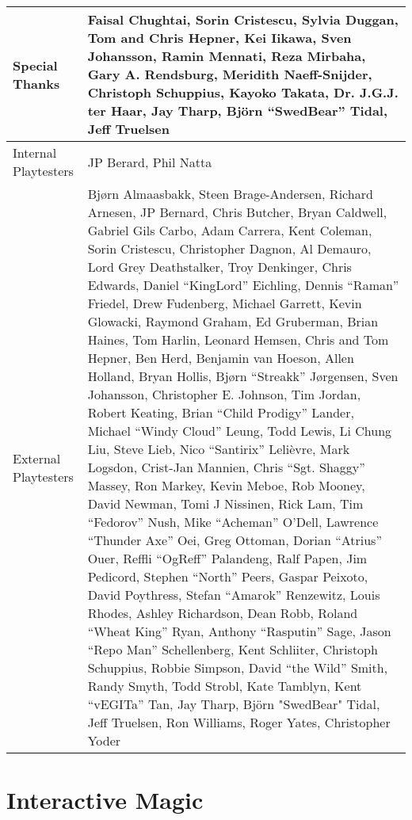 \begin{tabular}{ | p{4cm} | p{9cm} |}
	\hline
Special Thanks	& Faisal Chughtai, Sorin Cristescu, Sylvia Duggan, Tom and Chris Hepner, Kei Iikawa, Sven Johansson, Ramin Mennati, Reza Mirbaha, Gary A. Rendsburg, Meridith Naeff-Snijder, Christoph Schuppius, Kayoko Takata, Dr. J.G.J. ter Haar, Jay Tharp, Björn “SwedBear” Tidal, Jeff Truelsen \\ \hline
Internal Playtesters	& JP Berard, Phil Natta \\ \hline
External Playtesters	& Bjørn Almaasbakk, Steen Brage-Andersen, Richard Arnesen, JP Bernard, Chris Butcher, Bryan Caldwell, Gabriel Gils Carbo, Adam Carrera, Kent Coleman, Sorin Cristescu, Christopher Dagnon, Al Demauro, Lord Grey Deathstalker, Troy Denkinger, Chris Edwards, Daniel “KingLord” Eichling, Dennis “Raman” Friedel, Drew Fudenberg, Michael Garrett, Kevin Glowacki, Raymond Graham, Ed Gruberman, Brian Haines, Tom Harlin, Leonard Hemsen, Chris and Tom Hepner, Ben Herd, Benjamin van Hoeson, Allen Holland, Bryan Hollis, Bjørn “Streakk” Jørgensen, Sven Johansson, Christopher E. Johnson, Tim Jordan, Robert Keating, Brian “Child Prodigy” Lander, Michael “Windy Cloud” Leung, Todd Lewis, Li Chung Liu, Steve Lieb, Nico “Santirix” Lelièvre, Mark Logsdon, Crist-Jan Mannien, Chris “Sgt. Shaggy” Massey, Ron Markey, Kevin Meboe, Rob Mooney, David Newman, Tomi J Nissinen, Rick Lam, Tim “Fedorov” Nush, Mike “Acheman” O'Dell, Lawrence “Thunder Axe” Oei, Greg Ottoman, Dorian “Atrius” Ouer, Reffli “OgReff” Palandeng, Ralf Papen, Jim Pedicord, Stephen “North” Peers, Gaspar Peixoto, David Poythress, Stefan “Amarok” Renzewitz, Louis Rhodes, Ashley Richardson, Dean Robb, Roland “Wheat King” Ryan, Anthony “Rasputin” Sage, Jason “Repo Man” Schellenberg, Kent Schliiter, Christoph Schuppius, Robbie Simpson, David “the Wild” Smith, Randy Smyth, Todd Strobl, Kate Tamblyn, Kent “vEGITa” Tan, Jay Tharp, Björn "SwedBear" Tidal, Jeff Truelsen, Ron Williams, Roger Yates, Christopher Yoder \\ \hline
	\hline
\end{tabular}

\section{Interactive Magic}

